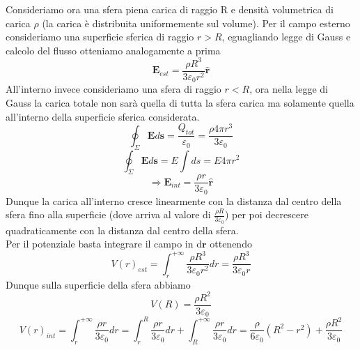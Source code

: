 \documentclass[
10pt, %
a4paper, %
oneside, %
headinclude,footinclude, %
BCOR5mm, %
]{scrartcl}
\begin{document}
\begin{esercizio}
Consideriamo ora una sfera piena carica di raggio R e densità volumetrica di carica $\rho$ (la carica è distribuita uniformemente sul volume). Per il campo esterno consideriamo una superficie sferica di raggio \(r>R\), eguagliando legge di Gauss e calcolo del flusso otteniamo analogamente a prima 
\[\mathbf{E}_{est} = \frac{\rho R^3}{3 \varepsilon_0 r^2}\hat{\mathbf{r}}\]
All'interno invece consideriamo una sfera di raggio \(r<R\), ora nella legge di Gauss la carica totale non sarà quella di tutta la sfera carica ma solamente quella all'interno della superficie sferica considerata. 
\[\oint_{\Sigma}\mathbf{E}d\mathbf{s}=\frac{Q_{tot}}{\varepsilon_0} = \frac{\rho 4 \pi r^3}{3\varepsilon_0}\]
\[\oint_{\Sigma}\mathbf{E}d\mathbf{s}=E\int ds = E 4\pi r^2\]
\[\Rightarrow \mathbf{E}_{int} = \frac{\rho r}{3 \varepsilon_0}\hat{\mathbf{r}}\]
Dunque la carica all'interno cresce linearmente con la distanza dal centro della sfera fino alla superficie (dove arriva al valore di \(\frac{\rho R}{3 \varepsilon_0}\)) per poi decrescere quadraticamente con la distanza dal centro della sfera.\\
Per il potenziale basta integrare il campo in d$\mathbf{r}$ ottenendo
\[V(r)_{est} = \int_{r}^{+\infty} \frac{\rho R^3}{3 \varepsilon_0 r^2}dr = \frac{\rho R^3}{3 \varepsilon_0 r}\]
Dunque sulla superficie della sfera abbiamo
\[V(R) = \frac{\rho R^2}{3 \varepsilon_0 }\]
\[V(r)_{int} = \int_{r}^{+\infty} \frac{\rho r}{3 \varepsilon_0} dr = \int_{r}^{R}\frac{\rho r}{3 \varepsilon_0} dr+\int_{R}^{+\infty}\frac{\rho r}{3 \varepsilon_0} dr =\frac{\rho}{6\varepsilon_0}\left(R^2-r^2\right) +\frac{\rho R^2}{3 \varepsilon_0 }\]
\end{esercizio}
\end{document}
